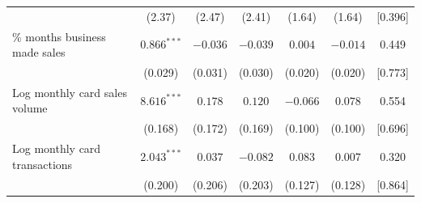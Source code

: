 \begin{tabular}{lcccccc}
 & (2.37) & (2.47) & (2.41) & (1.64) & (1.64) & {}[0.396] \\
\quad \% months business made sales & $0.866^{***}$ & $-0.036$ & $-0.039$ & $0.004$ & $-0.014$ & 0.449 \\
 & (0.029) & (0.031) & (0.030) & (0.020) & (0.020) & {}[0.773] \\
\quad Log monthly card sales volume & $8.616^{***}$ & $0.178$ & $0.120$ & $-0.066$ & $0.078$ & 0.554 \\
 & (0.168) & (0.172) & (0.169) & (0.100) & (0.100) & {}[0.696] \\
\quad Log monthly card transactions & $2.043^{***}$ & $0.037$ & $-0.082$ & $0.083$ & $0.007$ & 0.320 \\
 & (0.200) & (0.206) & (0.203) & (0.127) & (0.128) & {}[0.864] \\
\bottomrule
\end{tabular}
